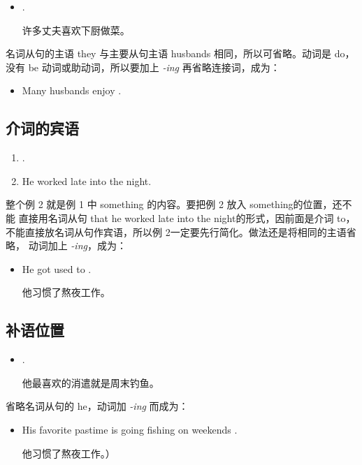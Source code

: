 \begin{itemize}
\item {}  .

  许多丈夫喜欢下厨做菜。
\end{itemize}
名词从句的主语 they 与主要从句主语 husbands 相同，所以可省略。动词是
do，没有 be 动词或助动词，所以要加上 \emph{-ing} 再省略连接词，成为：
\begin{itemize}
\item Many husbands enjoy .
\end{itemize}

\subsection{ 介词的宾语}

\begin{enumerate}
\item {}    .
\item He worked late into the night.
\end{enumerate}

整个例 2 就是例 1 中 something 的内容。要把例 2 放入 something的位置，还不能
直接用名词从句 that he worked late into the night的形式，因前面是介词 to，
不能直接放名词从句作宾语，所以例 2一定要先行简化。做法还是将相同的主语省略，
动词加上 \emph{-ing}，成为：

\begin{itemize}
\item He got used to .

  他习惯了熬夜工作。
\end{itemize}

\subsection{补语位置}

\begin{itemize}
\item {}  .

  他最喜欢的消遣就是周末钓鱼。
\end{itemize}
省略名词从句的 he，动词加 \emph{-ing} 而成为：
\begin{itemize}
\item   His favorite pastime is going fishing on weekends .

他习惯了熬夜工作。）
\end{itemize}

